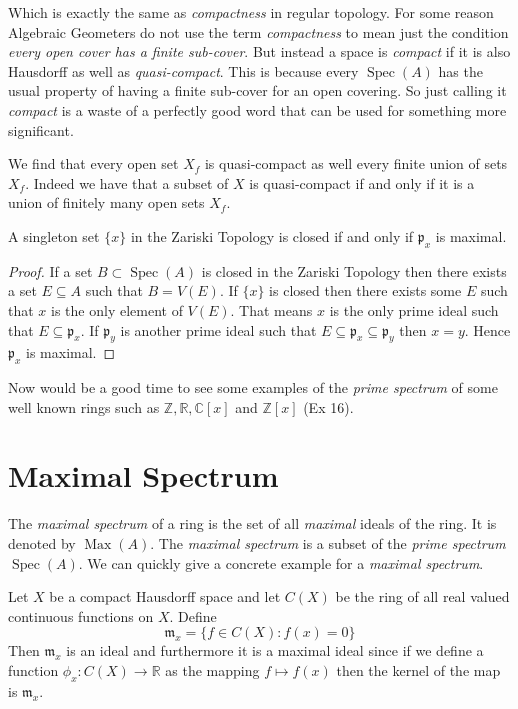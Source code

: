 \documentclass[]{report}
\DeclareMathOperator\Spec{Spec}
\DeclareMathOperator\Max{Max}
\begin{document}
    Which is exactly the same as \textit{compactness} in regular topology. For some reason Algebraic Geometers do not use the term \textit{compactness} to mean just the condition \textit{every open cover has a finite sub-cover}. But instead a space is \textit{compact} if it is also Hausdorff as well as \textit{quasi-compact}. This is because every $\Spec(A)$ has the usual property of having a finite sub-cover for an open covering. So just calling it \textit{compact} is a waste of a perfectly good word that can be used for something more significant. 

    We find that every open set $X_f$ is quasi-compact as well every finite union of sets $X_f$. Indeed we have that a subset of $X$ is quasi-compact if and only if it is a union of finitely many open sets $X_f$.

    A singleton set $\{x\}$ in the Zariski Topology is closed if and only if $\mathfrak{p}_x$ is maximal.
\begin{proof}
    If a set $B \subset \Spec(A)$ is closed in the Zariski Topology then there exists a set $E \subseteq A$ such that $B = V(E)$. If $\{x\}$ is closed then there exists some $E$ such that $x$ is the only element of $V(E)$. That means $x$ is the only prime ideal such that $E \subseteq \mathfrak{p}_x$. If $\mathfrak{p}_y$ is another prime ideal such that $E \subseteq \mathfrak{p}_x \subseteq \mathfrak{p}_y$ then $x = y$. Hence $\mathfrak{p}_x$ is maximal.
\end{proof}

    Now would be a good time to see some examples of the \textit{prime spectrum} of some well known rings such as $\mathbb{Z, R, C}[x]$ and $\mathbb{Z}[x]$ (Ex 16).



\section{Maximal Spectrum}

The \textit{maximal spectrum} of a ring is the set of all \textit{maximal} ideals of the ring. It is denoted by $\Max(A)$. The \textit{maximal spectrum} is a subset of the \textit{prime spectrum} $\Spec(A)$. We can quickly give a concrete example for a \textit{maximal spectrum}.

Let $X$ be a compact Hausdorff space and let $C(X)$ be the ring of all real valued continuous functions on $X$. Define
$$\mathfrak{m}_x = \{f\in C(X): f(x) = 0\}$$
Then $\mathfrak{m}_x$ is an ideal and furthermore it is a maximal ideal since if we define a function $\phi_x: C(X) \rightarrow \mathbb{R}$ as the mapping $f\mapsto f(x)$ then the kernel of the map is $\mathfrak{m}_x$. 
\end{document}
